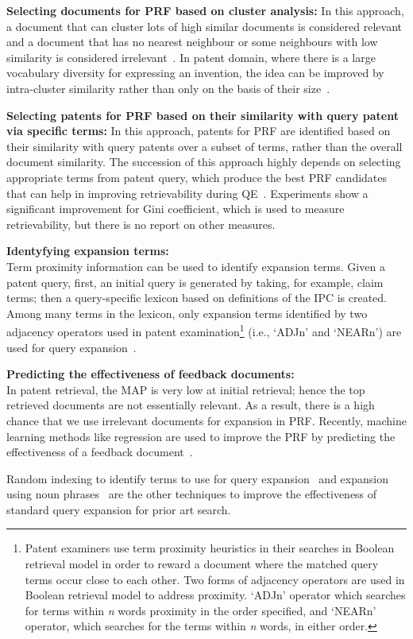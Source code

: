 \begin{list}{-}{}
\item \textbf{Selecting documents for PRF based on cluster analysis:} In this approach, a document that can cluster lots of high similar documents is considered relevant and a document that has no nearest neighbour or some neighbours with low similarity is considered irrelevant~\citep{lee2008cluster}. In patent domain, where there is a large vocabulary diversity for expressing an invention, the idea can be improved by intra-cluster similarity rather than only on the basis of their size~\citep{bashir2009improving}. 
\item \textbf{Selecting patents for PRF based on their similarity with query patent via specific terms:} In this approach, patents for PRF are identified based on their similarity with query patents over a subset of terms, rather than the overall document similarity. The succession of this approach highly depends on selecting appropriate terms from patent query, which produce the best PRF candidates that can help in improving retrievability during QE~\citep{bashir2010improving}. Experiments show a significant improvement for Gini coefficient, which is used to measure retrievability, but there is no report on other measures.
\item \textbf{Identyfying expansion terms: } 
\ \\
Term proximity information can be used to identify expansion terms. Given a patent query, first, an initial query is generated by taking, for example, claim terms; then a query-specific lexicon based on definitions of the IPC is created.
Among many terms in the lexicon, only expansion terms identified by two adjacency operators used in patent examination\footnote{Patent examiners use term proximity heuristics in their
searches in Boolean retrieval model in order to reward a
document where the matched query terms occur close to
each other. Two forms of adjacency operators are used in
Boolean retrieval model to address proximity. `ADJn' operator which searches for terms within \textit{n} words proximity in
the order specified, and `NEARn' operator, which searches
for the terms within \textit{n} words, in either order.} (i.e., `ADJn' and `NEARn') are used for query expansion~\citep{mahdabi2013leveraging}.
\item \textbf{Predicting the effectiveness of feedback documents: } 
\ \\
In patent retrieval, the MAP is very low at initial retrieval; hence the top retrieved documents are not essentially relevant. 
As a result, there is a high
chance that we use irrelevant documents for expansion in PRF. Recently,
machine learning methods like regression are used to improve the PRF by predicting the effectiveness of a feedback document~\citep{mahdabi2012learning}.
\end{list}
Random indexing to identify terms to use for query expansion~\citep{sahlgren2002english} and expansion using noun phrases~\citep{mahdabi2012automatic} are the other techniques to improve the effectiveness of standard query expansion for prior art search. 
